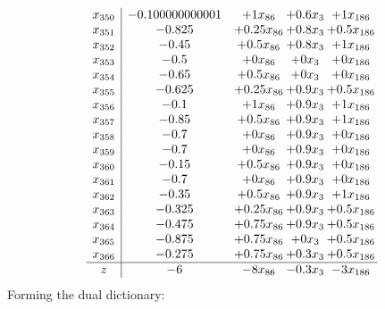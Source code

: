 \documentclass[11pt]{article}
\begin{document}
\[\begin{array}{c| c c@{\hskip 2pt} c@{\hskip 2pt} c@{\hskip 2pt} }
 x_{350}   &  -0.100000000001 & + 1 x_{86} & + 0.6 x_{3} & + 1 x_{186}\\
 x_{351}   &  -0.825 & + 0.25 x_{86} & + 0.8 x_{3} & + 0.5 x_{186}\\
 x_{352}   &  -0.45 & + 0.5 x_{86} & + 0.8 x_{3} & + 1 x_{186}\\
 x_{353}   &  -0.5 & + 0 x_{86} & + 0 x_{3} & + 0 x_{186}\\
 x_{354}   &  -0.65 & + 0.5 x_{86} & + 0 x_{3} & + 0 x_{186}\\
 x_{355}   &  -0.625 & + 0.25 x_{86} & + 0.9 x_{3} & + 0.5 x_{186}\\
 x_{356}   &  -0.1 & + 1 x_{86} & + 0.9 x_{3} & + 1 x_{186}\\
 x_{357}   &  -0.85 & + 0.5 x_{86} & + 0.9 x_{3} & + 1 x_{186}\\
 x_{358}   &  -0.7 & + 0 x_{86} & + 0.9 x_{3} & + 0 x_{186}\\
 x_{359}   &  -0.7 & + 0 x_{86} & + 0.9 x_{3} & + 0 x_{186}\\
 x_{360}   &  -0.15 & + 0.5 x_{86} & + 0.9 x_{3} & + 0 x_{186}\\
 x_{361}   &  -0.7 & + 0 x_{86} & + 0.9 x_{3} & + 0 x_{186}\\
 x_{362}   &  -0.35 & + 0.5 x_{86} & + 0.9 x_{3} & + 1 x_{186}\\
 x_{363}   &  -0.325 & + 0.25 x_{86} & + 0.9 x_{3} & + 0.5 x_{186}\\
 x_{364}   &  -0.475 & + 0.75 x_{86} & + 0.9 x_{3} & + 0.5 x_{186}\\
 x_{365}   &  -0.875 & + 0.75 x_{86} & + 0 x_{3} & + 0.5 x_{186}\\
 x_{366}   &  -0.275 & + 0.75 x_{86} & + 0.3 x_{3} & + 0.5 x_{186}\\
\hline
z    &  -6 & -8 x_{86} & -0.3 x_{3} & -3 x_{186}\\
\end{array}\]
Forming the dual dictionary:
\end{document}

